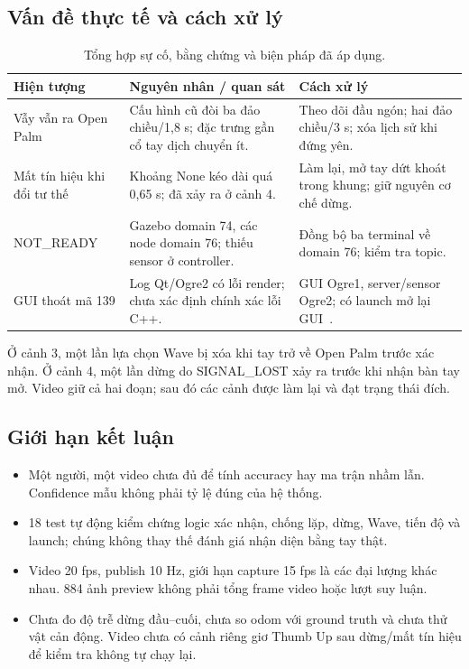 \documentclass[12pt,a4paper]{article}
\newcommand{\smalltable}{\small\setlength{\tabcolsep}{4pt}\renewcommand{\arraystretch}{1.12}}
\begin{document}
\subsection{Vấn đề thực tế và cách xử lý}

\begin{table}[!htbp]\centering\smalltable
\begin{tabularx}{\linewidth}{@{}p{3cm}LL@{}}\toprule
\textbf{Hiện tượng} & \textbf{Nguyên nhân / quan sát} & \textbf{Cách xử lý}\\\midrule
Vẫy vẫn ra Open Palm & Cấu hình cũ đòi ba đảo chiều/1,8 s; đặc trưng gần cổ tay dịch chuyển ít. & Theo dõi đầu ngón; hai đảo chiều/3 s; xóa lịch sử khi đứng yên.\\
Mất tín hiệu khi đổi tư thế & Khoảng None kéo dài quá 0,65 s; đã xảy ra ở cảnh 4. & Làm lại, mở tay dứt khoát trong khung; giữ nguyên cơ chế dừng.\\
NOT\_READY & Gazebo domain 74, các node domain 76; thiếu sensor ở controller. & Đồng bộ ba terminal về domain 76; kiểm tra topic.\\
GUI thoát mã 139 & Log Qt/Ogre2 có lỗi render; chưa xác định chính xác lỗi C++. & GUI Ogre1, server/sensor Ogre2; có launch mở lại GUI~\cite{gz}.\\\bottomrule
\end{tabularx}
\caption{Tổng hợp sự cố, bằng chứng và biện pháp đã áp dụng.}
\end{table}

Ở cảnh 3, một lần lựa chọn Wave bị xóa khi tay trở về Open Palm trước xác nhận. Ở cảnh 4, một lần dừng do SIGNAL\_LOST xảy ra trước khi nhận bàn tay mở. Video giữ cả hai đoạn; sau đó các cảnh được làm lại và đạt trạng thái đích.

\subsection{Giới hạn kết luận}
\begin{itemize}
\item Một người, một video chưa đủ để tính accuracy hay ma trận nhầm lẫn. Confidence mẫu không phải tỷ lệ đúng của hệ thống.
\item 18 test tự động kiểm chứng logic xác nhận, chống lặp, dừng, Wave, tiến độ và launch; chúng không thay thế đánh giá nhận diện bằng tay thật.
\item Video 20 fps, publish 10 Hz, giới hạn capture 15 fps là các đại lượng khác nhau. 884 ảnh preview không phải tổng frame video hoặc lượt suy luận.
\item Chưa đo độ trễ dừng đầu--cuối, chưa so odom với ground truth và chưa thử vật cản động. Video chưa có cảnh riêng giơ Thumb Up sau dừng/mất tín hiệu để kiểm tra không tự chạy lại.
\end{itemize}
\end{document}

